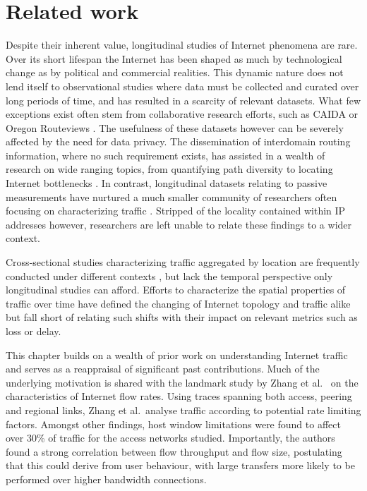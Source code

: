 \section{Related work}
\label{section:malawi:related}

Despite their inherent value, longitudinal studies of Internet phenomena are rare. 
Over its short lifespan the Internet has been shaped as much by technological change as by political and commercial realities. 
This dynamic nature does not lend itself to observational studies where data must be collected and curated over long periods of time, and has resulted in a scarcity of relevant datasets. 
What few exceptions exist often stem from collaborative research efforts, such as CAIDA \cite{CAIDA} or Oregon Routeviews \cite{routeviews}. 
The usefulness of these datasets however can be severely affected by the need for data privacy. 
The dissemination of interdomain routing information, where no such requirement exists, has assisted in a wealth of research on wide ranging topics, from quantifying path diversity \cite{Oliveira:2009p203} to locating Internet bottlenecks \cite{Hu:2004p96}. 
In contrast, longitudinal datasets relating to passive measurements have nurtured a much smaller community of researchers often focusing on characterizing traffic \cite{Fontugne:2010p413}. 
Stripped of the locality contained within IP addresses however, researchers are left unable to relate these findings to a wider context.

Cross-sectional studies characterizing traffic aggregated by location are frequently conducted under different contexts \cite{Ager:2011:WCC:2068816.2068870}, but lack the temporal perspective only longitudinal studies can afford. 
Efforts to characterize the spatial properties of traffic over time \cite{Dhamdhere:2011p428,Labovitz:2010:IIT:2043164.1851194,Cho:2008:OSC:1544012.1544024} have defined the changing of Internet topology and traffic alike but fall short of relating such shifts with their impact on relevant metrics such as loss or delay. 

This chapter builds on a wealth of prior work on understanding Internet traffic and serves as a reappraisal of significant past contributions. 
Much of the underlying motivation is shared with the landmark study by Zhang et al.\ \cite{Zhang:2002p85} on the characteristics of Internet flow rates.
Using traces spanning both access, peering and regional links, Zhang et al.\ analyse traffic according to potential rate limiting factors.
Amongst other findings, host window limitations were found to affect over 30\% of traffic for the access networks studied.
Importantly, the authors found a strong correlation between flow throughput and flow size, postulating that this could derive from user behaviour, with large transfers more likely to be performed over higher bandwidth connections.

